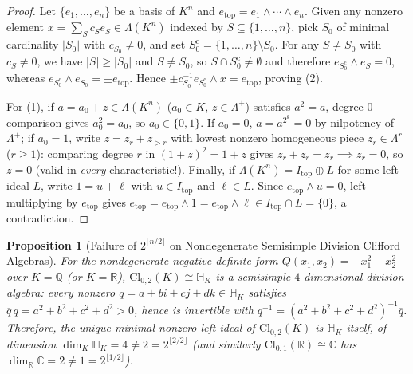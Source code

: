 \documentclass[11pt,a4paper]{article}
\newtheorem{proposition}[theorem]{Proposition}
\theoremstyle{definition}
\newcommand{\Cl}{\mathrm{Cl}}
\begin{document}
\begin{proof}
Let $\{e_1, \dots, e_n\}$ be a basis of $K^n$ and $e_{\mathrm{top}} = e_1 \wedge \cdots \wedge e_n$. Given any nonzero element $x = \sum_S c_S e_S \in \Lambda(K^n)$ indexed by $S \subseteq \{1,\dots,n\}$, pick $S_0$ of minimal cardinality $|S_0|$ with $c_{S_0} \neq 0$, and set $S_0^{\mathrm{c}} = \{1,\dots,n\} \setminus S_0$. For any $S \neq S_0$ with $c_S \neq 0$, we have $|S| \ge |S_0|$ and $S \neq S_0$, so $S \cap S_0^{\mathrm{c}} \neq \emptyset$ and therefore $e_{S_0^{\mathrm{c}}} \wedge e_S = 0$, whereas $e_{S_0^{\mathrm{c}}} \wedge e_{S_0} = \pm e_{\mathrm{top}}$. Hence $\pm c_{S_0}^{-1} e_{S_0^{\mathrm{c}}} \wedge x = e_{\mathrm{top}}$, proving (2).

For (1), if $a = a_0 + z \in \Lambda(K^n)$ ($a_0 \in K$, $z \in \Lambda^+$) satisfies $a^2 = a$, degree-$0$ comparison gives $a_0^2 = a_0$, so $a_0 \in \{0, 1\}$. If $a_0 = 0$, $a = a^{2^k} = 0$ by nilpotency of $\Lambda^+$; if $a_0 = 1$, write $z = z_r + z_{>r}$ with lowest nonzero homogeneous piece $z_r \in \Lambda^r$ ($r \ge 1$): comparing degree $r$ in $(1 + z)^2 = 1 + z$ gives $z_r + z_r = z_r \implies z_r = 0$, so $z = 0$ (valid in \emph{every} characteristic!). Finally, if $\Lambda(K^n) = I_{\mathrm{top}} \oplus L$ for some left ideal $L$, write $1 = u + \ell$ with $u \in I_{\mathrm{top}}$ and $\ell \in L$. Since $e_{\mathrm{top}} \wedge u = 0$, left-multiplying by $e_{\mathrm{top}}$ gives $e_{\mathrm{top}} = e_{\mathrm{top}} \wedge 1 = e_{\mathrm{top}} \wedge \ell \in I_{\mathrm{top}} \cap L = \{0\}$, a contradiction.
\end{proof}

\begin{proposition}[Failure of $2^{\lfloor n/2 \rfloor}$ on Nondegenerate Semisimple Division Clifford Algebras]\label{prop:quat}
For the nondegenerate negative-definite form $Q(x_1, x_2) = -x_1^2 - x_2^2$ over $K = \mathbb{Q}$ (or $K = \mathbb{R}$), $\Cl_{0,2}(K) \cong \mathbb{H}_K$ is a semisimple $4$-dimensional division algebra: every nonzero $q = a + bi + cj + dk \in \mathbb{H}_K$ satisfies $\overline{q}\,q = a^2 + b^2 + c^2 + d^2 > 0$, hence is invertible with $q^{-1} = (a^2 + b^2 + c^2 + d^2)^{-1}\overline{q}$. Therefore, the unique minimal nonzero left ideal of $\Cl_{0,2}(K)$ is $\mathbb{H}_K$ itself, of dimension $\dim_K \mathbb{H}_K = 4 \neq 2 = 2^{\lfloor 2/2 \rfloor}$ (and similarly $\Cl_{0,1}(\mathbb{R}) \cong \mathbb{C}$ has $\dim_{\mathbb{R}} \mathbb{C} = 2 \neq 1 = 2^{\lfloor 1/2 \rfloor}$).
\end{proposition}
\end{document}
